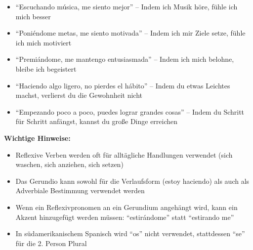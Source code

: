 \documentclass[12pt,a4paper]{article}
\begin{document}
\begin{itemize}[leftmargin=*]
    \item \enquote{Escuchando música, me siento mejor} -- Indem ich Musik höre, fühle ich mich besser
    \item \enquote{Poniéndome metas, me siento motivada} -- Indem ich mir Ziele setze, fühle ich mich motiviert
    \item \enquote{Premiándome, me mantengo entusiasmada} -- Indem ich mich belohne, bleibe ich begeistert
    \item \enquote{Haciendo algo ligero, no pierdes el hábito} -- Indem du etwas Leichtes machst, verlierst du die Gewohnheit nicht
    \item \enquote{Empezando poco a poco, puedes lograr grandes cosas} -- Indem du Schritt für Schritt anfängst, kannst du große Dinge erreichen
\end{itemize}

\textbf{Wichtige Hinweise:}
\begin{itemize}[leftmargin=*]
    \item Reflexive Verben werden oft für alltägliche Handlungen verwendet (sich waschen, sich anziehen, sich setzen)
    \item Das Gerundio kann sowohl für die Verlaufsform (estoy haciendo) als auch als Adverbiale Bestimmung verwendet werden
    \item Wenn ein Reflexivpronomen an ein Gerundium angehängt wird, kann ein Akzent hinzugefügt werden müssen: \enquote{estirándome} statt \enquote{estirando me}
    \item In südamerikanischem Spanisch wird \enquote{os} nicht verwendet, stattdessen \enquote{se} für die 2. Person Plural
\end{itemize}
\end{document}
